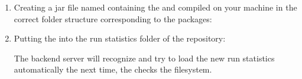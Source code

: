 \begin{enumerate}
			\item Creating a jar file named  containing the  and  compiled on your machine in the correct folder structure corresponding to the packages:
			
			
			
			\item Putting the  into the run statistics folder of the repository:
			
			\highlight{\reposupprunstats}
			
			The backend server will recognize and try to load the new run statistics automatically the next time, the  checks the filesystem.
		\end{enumerate}
		
		
